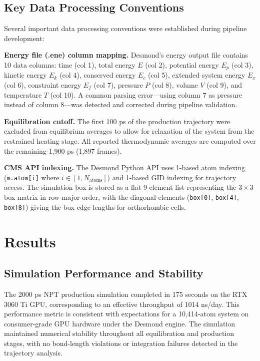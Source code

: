 \documentclass[twocolumn,10pt]{article}
\begin{document}
\subsection{Key Data Processing Conventions}
\label{sec:conventions}

Several important data processing conventions were established during pipeline development:

\textbf{Energy file (.ene) column mapping.} Desmond's energy output file contains 10 data columns: time (col 1), total energy $E$ (col 2), potential energy $E_p$ (col 3), kinetic energy $E_k$ (col 4), conserved energy $E_c$ (col 5), extended system energy $E_x$ (col 6), constraint energy $E_f$ (col 7), pressure $P$ (col 8), volume $V$ (col 9), and temperature $T$ (col 10). A common parsing error---using column 7 as pressure instead of column 8---was detected and corrected during pipeline validation.

\textbf{Equilibration cutoff.} The first 100 ps of the production trajectory were excluded from equilibrium averages to allow for relaxation of the system from the restrained heating stage. All reported thermodynamic averages are computed over the remaining 1,900 ps (1,897 frames).

\textbf{CMS API indexing.} The Desmond Python API uses 1-based atom indexing (\texttt{m.atom[i]} where $i \in [1, N_{\text{atoms}}]$) and 1-based GID indexing for trajectory access. The simulation box is stored as a flat 9-element list representing the $3\times3$ box matrix in row-major order, with the diagonal elements (\texttt{box[0]}, \texttt{box[4]}, \texttt{box[8]}) giving the box edge lengths for orthorhombic cells.

\section{Results}
\label{sec:results}

\subsection{Simulation Performance and Stability}
\label{sec:sim_performance}

The 2000 ps NPT production simulation completed in 175 seconds on the RTX 3060 Ti GPU, corresponding to an effective throughput of 1014 ns/day. This performance metric is consistent with expectations for a 10,414-atom system on consumer-grade GPU hardware under the Desmond engine. The simulation maintained numerical stability throughout all equilibration and production stages, with no bond-length violations or integration failures detected in the trajectory analysis.
\end{document}
